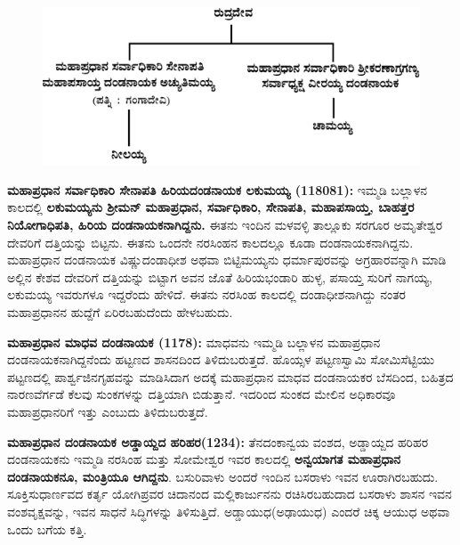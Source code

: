 \begin{figure}[!h]
\includegraphics[scale=1.15]{images/chap3/chap3fig18.jpeg}
\end{figure}

\textbf{ಮಹಾಪ್ರಧಾನ ಸರ್ವಾಧಿಕಾರಿ ಸೇನಾಪತಿ ಹಿರಿಯದಂಡನಾಯಕ ಲಕುಮಯ್ಯ (1180\general{\enginline{-}}81):} ಇಮ್ಮಡಿ ಬಲ್ಲಾಳನ ಕಾಲದಲ್ಲಿ \textbf{ಲಕುಮಯ್ಯನು ಶ‍್ರೀಮನ್​ ಮಹಾಪ್ರಧಾನ, ಸರ್ವಾಧಿಕಾರಿ, ಸೇನಾಪತಿ, ಮಹಾಪಸಾಯ್ತ, ಬಾಹತ್ತರ ನಿಯೋಗಾಧಿಪತಿ, ಹಿರಿಯ ದಂಡನಾಯಕನಾಗಿದ್ದನು.} ಈತನು ಇಂದಿನ ಮಳವಳ್ಳಿ ತಾಲ್ಲೂಕು ಸರಗೂರ ಅಮೃತೇಶ್ವರ ದೇವರಿಗೆ ದತ್ತಿಯನ್ನು ಬಿಟ್ಟನು. ಈತನು ಒಂದನೇ ನರಸಿಂಹನ ಕಾಲದಲ್ಲೂ ಕೂಡಾ ದಂಡನಾಯಕನಾಗಿದ್ದನು. ಮಹಾಪ್ರಧಾನ ದಂಡನಾಯಕ ವಿಷ್ಣುದಂಡಾಧೀಶ ಅಥವಾ ಬಿಟ್ಟಿಮಯ್ಯನು ಧರ್ಮಾಪುರವನ್ನು ಅಗ್ರಹಾರವನ್ನಾಗಿ ಮಾಡಿ ಅಲ್ಲಿನ ಕೇಶವ ದೇವರಿಗೆ ದತ್ತಿಯನ್ನು ಬಿಟ್ಟಾಗ ಅವನ ಜೊತೆ ಹಿರಿಯಭಂಡಾರಿ ಹುಳ್ಳ, ಪಸಾಯ್ತ ಸುರಿಗೆ ನಾಗಯ್ಯ, ಲಕುಮಯ್ಯ ಇವರುಗಳೂ ಇದ್ದರೆಂದು ಹೇಳಿದೆ. ಈತನು ನರಸಿಂಹ ಕಾಲದಲ್ಲಿ ದಂಡಾಧೀಶನಾಗಿದ್ದು ನಂತರ ಮಹಾಪ್ರಧಾನನ ಹುದ್ದೆಗೆ ಏರಿರಬಹುದೆಂದು ಹೇಳಬಹುದು.

\textbf{ಮಹಾಪ್ರಧಾನ ಮಾಧವ ದಂಡನಾಯಕ (1178): }ಮಾಧವನು ಇಮ್ಮಡಿ ಬಲ್ಲಾಳನ ಮಹಾಪ್ರಧಾನ ದಂಡನಾಯಕ\-ನಾಗಿದ್ದನೆಂದು ಹಟ್ಟಣದ ಶಾಸನದಿಂದ ತಿಳಿದುಬರುತ್ತದೆ. ಹೊಯ್ಸಳ ಪಟ್ಟಣಸ್ವಾಮಿ ಸೋಮಿಸೆಟ್ಟಿಯು ಪಟ್ಟಣದಲ್ಲಿ ಪಾರ್ಶ್ವಜಿನಗೃಹವನ್ನು ಮಾಡಿಸಿದಾಗ ಅದಕ್ಕೆ ಮಹಾಪ್ರಧಾನ ಮಾಧವ ದಂಡನಾಯಕರ ಬೆಸದಿಂದ, ಬಹಿತ್ರದ ನಾರಣವೆರ್ಗಡೆ ಕೆಲವು ಸುಂಕಗಳನ್ನು ದತ್ತಿಯಾಗಿ ಬಿಡುತ್ತಾನೆ. ಇದರಿಂದ ಸುಂಕದ ಮೇಲಿನ ಅಧಿಕಾರವೂ ಮಹಾಪ್ರಧಾನರಿಗೆ ಇತ್ತು ಎಂಬುದು ತಿಳಿದುಬರುತ್ತದೆ.

\textbf{ಮಹಾಪ್ರಧಾನ ದಂಡನಾಯಕ ಅಡ್ಡಾಯ್ದದ ಹರಿಹರ(1234):} ತೆನದಂಕಾನ್ವಯ ವಂಶದ, ಅಡ್ಡಾಯ್ದದ ಹರಿಹರ ದಂಡನಾಯಕನು ಇಮ್ಮಡಿ ನರಸಿಂಹ ಮತ್ತು ಸೋಮೇಶ್ವರ ಇವರ ಕಾಲದಲ್ಲಿ \textbf{ಅನ್ವಯಾಗತ ಮಹಾಪ್ರಧಾನ ದಂಡನಾಯಕನೂ, ಮಂತ್ರಿಯೂ ಆಗಿದ್ದನು}. ಬಸುರಿವಾಳು ಅಂದರೆ ಇಂದಿನ ಬಸರಾಳು ಇವನ ಊರಾಗಿರಬಹುದು. ಸೂಕ್ತಿಸುಧಾರ್ಣವದ ಕರ್ತೃ ಯೋಗಿಪ್ರವರ ಚಿದಾನಂದ ಮಲ್ಲಿಕಾರ್ಜುನನು ರಚಿಸಿರಬಹುದಾದ ಬಸರಾಳು ಶಾಸನ ಇವನ ವಂಶವೃಕ್ಷವನ್ನು, ಇವನ ಸಾಧನೆ ಸಿದ್ಧಿಗಳನ್ನು ತಿಳಿಸುತ್ತಿದೆ. ಅಡ್ಡಾಯುಧ(ಅಢಾಯುಧ) ಎಂದರೆ ಚಿಕ್ಕ ಆಯುಧ ಅಥವಾ ಒಂದು ಬಗೆಯ ಕತ್ತಿ.

\newpage


